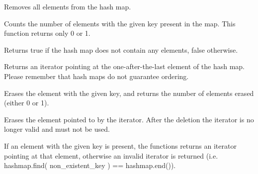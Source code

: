 \label{wxhashmapclear}


Removes all elements from the hash map.

\label{wxhashmapcount}


Counts the number of elements with the given key present in the map.
This function returns only 0 or 1.

\label{wxhashmapempty}


Returns true if the hash map does not contain any elements, false otherwise.

\label{wxhashmapend}



Returns an iterator pointing at the one-after-the-last element of the hash map.
Please remember that hash maps do not guarantee ordering.

\label{wxhashmaperase}


Erases the element with the given key, and returns the number of elements
erased (either 0 or 1).



Erases the element pointed to by the iterator. After the deletion
the iterator is no longer valid and must not be used.

\label{wxhashmapfind}



If an element with the given key is present, the functions returns
an iterator pointing at that element, otherwise an invalid iterator
is returned (i.e. hashmap.find( non\_existent\_key ) == hashmap.end()).

\label{wxhashmapinsert}


